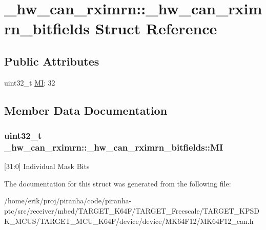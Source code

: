 \hypertarget{struct__hw__can__rximrn_1_1__hw__can__rximrn__bitfields}{}\section{\+\_\+hw\+\_\+can\+\_\+rximrn\+:\+:\+\_\+hw\+\_\+can\+\_\+rximrn\+\_\+bitfields Struct Reference}
\label{struct__hw__can__rximrn_1_1__hw__can__rximrn__bitfields}
\subsection*{Public Attributes}
\begin{DoxyCompactItemize}
\item 
uint32\+\_\+t \hyperlink{struct__hw__can__rximrn_1_1__hw__can__rximrn__bitfields_ab5a9691cc75379a60de6ca1b053a2fc4}{MI}\+: 32
\end{DoxyCompactItemize}


\subsection{Member Data Documentation}
\subsubsection[{\texorpdfstring{MI}{MI}}]{\setlength{\rightskip}{0pt plus 5cm}uint32\+\_\+t \+\_\+hw\+\_\+can\+\_\+rximrn\+::\+\_\+hw\+\_\+can\+\_\+rximrn\+\_\+bitfields\+::\+MI}\hypertarget{struct__hw__can__rximrn_1_1__hw__can__rximrn__bitfields_ab5a9691cc75379a60de6ca1b053a2fc4}{}\label{struct__hw__can__rximrn_1_1__hw__can__rximrn__bitfields_ab5a9691cc75379a60de6ca1b053a2fc4}
\mbox{[}31\+:0\mbox{]} Individual Mask Bits 

The documentation for this struct was generated from the following file\+:\begin{DoxyCompactItemize}
\item 
/home/erik/proj/piranha/code/piranha-\/ptc/src/receiver/mbed/\+T\+A\+R\+G\+E\+T\+\_\+\+K64\+F/\+T\+A\+R\+G\+E\+T\+\_\+\+Freescale/\+T\+A\+R\+G\+E\+T\+\_\+\+K\+P\+S\+D\+K\+\_\+\+M\+C\+U\+S/\+T\+A\+R\+G\+E\+T\+\_\+\+M\+C\+U\+\_\+\+K64\+F/device/device/\+M\+K64\+F12/M\+K64\+F12\+\_\+can.\+h\end{DoxyCompactItemize}
